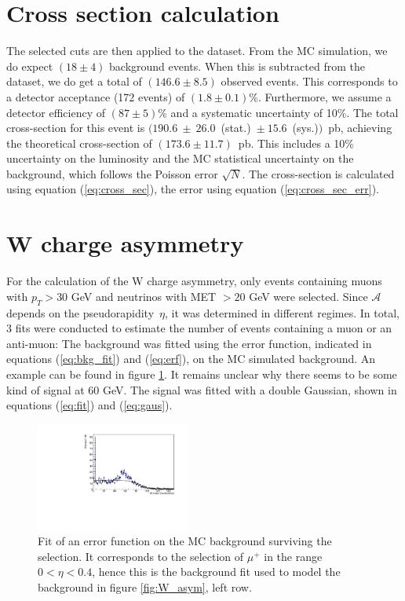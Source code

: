 \documentclass[%
 reprint,
 amsmath,amssymb,
 aps,
]{revtex4-2}
\begin{document}
\section{Cross section calculation}
The selected cuts are then applied to the dataset. From the MC simulation, we do expect $(18 \pm 4)$ background events. When this is subtracted from the dataset, we do get a total of $(146.6 \pm 8.5)$ observed events. This corresponds to a detector acceptance (172 events) of $(1.8 \pm 0.1)$\%. Furthermore, we assume a detector efficiency of $(87 \pm 5)$\% and a systematic uncertainty of 10\%. 
The total cross-section for this event is $(190.6~\pm~26.0$~(stat.)~$\pm~15.6$~(sys.)$)$~pb, achieving the theoretical cross-section of $(173.6 \pm 11.7)$~pb. This includes a 10\% uncertainty on the luminosity and the MC statistical uncertainty on the background, which follows the Poisson error $\sqrt{N}$. The cross-section is calculated using equation (\ref{eq:cross_sec}), the error using equation (\ref{eq:cross_sec_err}).


    
\section{W charge asymmetry}

For the calculation of the W charge asymmetry, only events containing muons with $p_T > 30$ GeV and neutrinos with MET $> 20$ GeV were selected. Since $\mathcal{A}$ depends on the pseudorapidity~$\eta$, it was determined in different regimes. 
In total, 3 fits were conducted to estimate the number of events containing a muon or an anti-muon:
The background was fitted using the error function, indicated in equations (\ref{eq:bkg_fit}) and (\ref{eq:erf}), on the MC simulated background. An example can be found in figure \ref{fig:fit_bkg}. It remains unclear why there seems to be some kind of signal at 60 GeV.  
The signal was fitted with a double Gaussian, shown in equations (\ref{eq:fit}) and (\ref{eq:gaus}). 

\begin{figure}
    \centering
    \includegraphics[width=0.45\textwidth]{Plots/part2/Background_fitpositive_0.pdf}
    \caption{Fit of an error function on the MC background surviving the selection. It corresponds to the selection of $\mu^+$ in the range $0 < \eta < 0.4$, hence this is the background fit used to model the background in figure \ref{fig:W_asym}, left row.}
    \label{fig:fit_bkg}
\end{figure}
\end{document}
